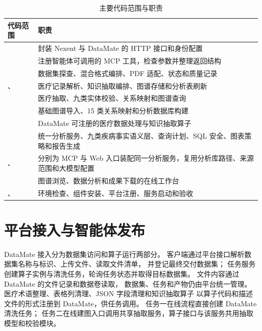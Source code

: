 \begin{table}[H]
\centering
\caption{主要代码范围与职责}
\label{tab:module-map}
\begin{tabularx}{\textwidth}{L{4.4cm}Y}
\toprule
\textbf{代码范围} & \textbf{职责} \\
\midrule
{} &
封装 Nexent 与 DataMate 的 HTTP 接口和身份配置 \\
 &
注册智能体可调用的 MCP 工具，检查参数并整理返回结构 \\
 &
数据集探查、混合格式编排、PDF 适配、状态和质量记录 \\
、 &
医疗记录解析、知识抽取编排、图谱存储和分析表刷新 \\
 &
医疗抽取、九类实体校验、关系映射和图谱查询 \\
 &
基础图谱导入、15 类关系映射和分析数据库构建 \\
 &
DataMate 可注册的医疗数据处理与知识抽取算子 \\
 &
统一分析服务、九类疾病事实语义层、查询计划、SQL 安全、图表策略和报告生成 \\
、 &
分别为 MCP 与 Web 入口装配同一分析服务，复用分析库路径、来源范围和大模型配置 \\
 &
图谱浏览、数据分析和成果下载的在线工作台 \\
、 &
环境检查、组件安装、平台注册、服务启动和验收 \\
\bottomrule
\end{tabularx}
\end{table}

\section{平台接入与智能体发布}

DataMate 接入分为数据集访问和算子运行两部分。
客户端通过平台接口解析数据集名称与标识、上传文件、读取文件清单，
并登记最终交付数据集；
任务服务创建算子实例与清洗任务，轮询任务状态并取得目标数据集。
文件内容通过 DataMate 的文件记录和数据卷读取，
数据集、任务和产物仍由平台统一管理。
医疗术语整理、表格列清理、JSON 字段清理和知识抽取算子
以算子代码和描述文件的形式注册到 DataMate，供任务调用。
任务一在线流程直接创建 DataMate 清洗任务；
任务二在线建图入口调用共享抽取服务，算子接口与该服务共用抽取模型和校验模块。

